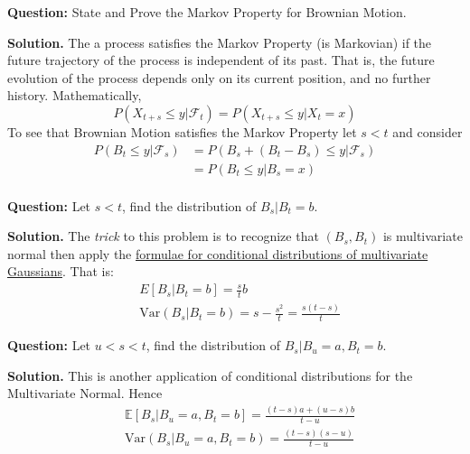 \documentclass{article}
\begin{document}
\begin{tcolorbox}[colframe=black,colback=gray!5,boxrule=0.5pt]
\textbf{Question:} State and Prove the Markov Property for Brownian Motion.
\end{tcolorbox}
\textbf{Solution.} The a process satisfies the Markov Property (is Markovian) if the future trajectory of the process is independent of its past. That is, the future evolution of the process depends only on its current position, and no further history. Mathematically, 
$$P(X_{t+s} \leq y| \mathcal{F}_t) = P(X_{t+s} \leq y| X_t=x)$$
To see that Brownian Motion satisfies the Markov Property let $s <t$ and consider 
\begin{align*}
    P(B_t \leq y| \mathcal{F}_s) &= P(B_s + (B_t-B_s) \leq y|\mathcal{F}_s) \\
    &= P(B_t \leq y| B_s =x) \\
\end{align*}

\begin{tcolorbox}[colframe=black,colback=gray!5,boxrule=0.5pt]
\textbf{Question:} Let $s < t$, find the distribution of $B_s | B_t = b$.
\end{tcolorbox}
\textbf{Solution.} The \textit{trick} to this problem is to recognize that $(B_s, B_t)$ is multivariate normal then apply the \href{https://online.stat.psu.edu/stat505/lesson/6/6.1}{formulae for conditional distributions of multivariate Gaussians}. That is: 
\begin{align*}
    & E[B_s | B_t=b] = \frac{s}{t}b \\
    &\text{Var}(B_s | B_t=b) = s-\frac{s^2}{t} = \frac{s(t-s)}{t}
\end{align*}

\begin{tcolorbox}[colframe=black,colback=gray!5,boxrule=0.5pt]

\textbf{Question:} Let $u<s < t$, find the distribution of $B_s | B_u=a,B_t = b$.
\end{tcolorbox}
\textbf{Solution.} This is another application of conditional distributions for the Multivariate Normal. Hence
\begin{align*}
    & \mathbb{E}[B_s | B_u=a, B_t=b] = \frac{(t-s)a + (u-s)b}{t-u} \\
    & \text{Var}(B_s | B_u = a, B_t=b) = \frac{(t-s)(s-u)}{t-u}
\end{align*}
$$$$
\end{document}
